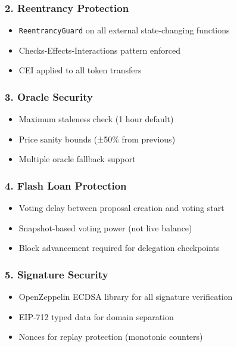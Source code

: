 \documentclass[
]{article}
\providecommand{\tightlist}{%
  \setlength{\itemsep}{0pt}\setlength{\parskip}{0pt}}
\begin{document}
\subsubsection{2. Reentrancy Protection}\label{2-reentrancy-protection}

\begin{itemize}
\tightlist
\item
  \texttt{ReentrancyGuard} on all external state-changing functions
\item
  Checks-Effects-Interactions pattern enforced
\item
  CEI applied to all token transfers
\end{itemize}

\subsubsection{3. Oracle Security}\label{3-oracle-security}

\begin{itemize}
\tightlist
\item
  Maximum staleness check (1 hour default)
\item
  Price sanity bounds (±50\% from previous)
\item
  Multiple oracle fallback support
\end{itemize}

\subsubsection{4. Flash Loan Protection}\label{4-flash-loan-protection}

\begin{itemize}
\tightlist
\item
  Voting delay between proposal creation and voting start
\item
  Snapshot-based voting power (not live balance)
\item
  Block advancement required for delegation checkpoints
\end{itemize}

\subsubsection{5. Signature Security}\label{5-signature-security}

\begin{itemize}
\tightlist
\item
  OpenZeppelin ECDSA library for all signature verification
\item
  EIP-712 typed data for domain separation
\item
  Nonces for replay protection (monotonic counters)
\end{itemize}
\end{document}
